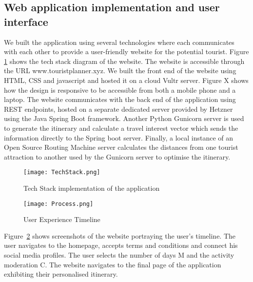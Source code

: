 
\subsection{Web application implementation and user
interface}

We built the application using several technologies
where each communicates with each other to provide a
user-friendly website for the potential tourist.
Figure \ref{TechStack} shows the tech stack diagram of the website.
The website is accessible through the URL
www.touristplanner.xyz. We built the front end of the
website using HTML, CSS and javascript and hosted it
on a cloud Vultr server.  Figure X shows how the
design is responsive to be accessible from both a
mobile phone and a laptop. The website communicates
with the back end of the application using REST
endpoints, hosted on a separate dedicated server
provided by Hetzner using the Java Spring Boot
framework.  Another Python Gunicorn server is used to
generate the itinerary and calculate a travel interest
vector which sends the information directly to the
Spring boot server. Finally, a local instance of an
Open Source Routing Machine server calculates the
distances from one tourist attraction to another used
by the Gunicorn server to optimise the itinerary. 

\begin{figure}[h]
\centering
\texttt{[image: TechStack.png]}
\caption{Tech Stack implementation of the application}
\label{TechStack}
\end{figure}

\begin{figure}[h]
\centering
\texttt{[image: Process.png]}
\caption{User Experience Timeline}
\label{Timeline}
\end{figure}

Figure~\ref{Timeline} shows screenshots of the website portraying
the user's timeline.  The user navigates to the
homepage, accepts terms and conditions and connect his
social media profiles.  The user selects the number of
days M and the activity moderation C.  The website
navigates to the final page of the application
exhibiting their personalised itinerary. 
